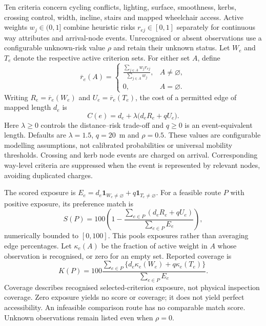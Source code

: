 \documentclass[preprint,12pt,a4paper]{elsarticle}
\begin{document}
Ten criteria concern cycling conflicts, lighting, surface, smoothness, kerbs,
crossing control, width, incline, stairs and mapped wheelchair access.
Active weights $w_j\in(0,1]$ combine heuristic risks $r_{ej}\in[0,1]$ separately
for continuous way attributes and arrival-node events. Unrecognised or absent
observations use a configurable unknown-risk value $\rho$ and retain their
unknown status. Let $W_e$ and $T_e$ denote the respective active criterion sets.
For either set $A$, define
\begin{equation}
\overline r_e(A)=
\begin{cases}
\displaystyle\frac{\sum_{j\in A}w_jr_{ej}}{\sum_{j\in A}w_j}, & A\ne\varnothing,\\
0, & A=\varnothing.
\end{cases}
\label{eq:risk}
\end{equation}
Writing $R_e=\overline r_e(W_e)$ and $U_e=\overline r_e(T_e)$, the cost of a
permitted edge of mapped length $d_e$ is
\begin{equation}
C(e)=d_e+\lambda\bigl(d_eR_e+qU_e\bigr).
\label{eq:cost}
\end{equation}
Here $\lambda\geq0$ controls the distance--risk trade-off and $q\geq0$ is an
event-equivalent length. Defaults are $\lambda=1.5$, $q=20$~m and $\rho=0.5$.
These values are configurable modelling assumptions, not calibrated
probabilities or universal mobility thresholds. Crossing and kerb node events
are charged on arrival. Corresponding way-level criteria are suppressed when
the event is represented by relevant nodes, avoiding duplicated charges.

The scored exposure is
$E_e=d_e\mathbf{1}_{W_e\ne\varnothing}+q\mathbf{1}_{T_e\ne\varnothing}$.
For a feasible route $P$ with positive exposure, its preference match is
\begin{equation}
S(P)=100\left(1-
\frac{\sum_{e\in P}(d_eR_e+qU_e)}{\sum_{e\in P}E_e}\right),
\label{eq:score}
\end{equation}
numerically bounded to $[0,100]$. This pools exposures rather than averaging
edge percentages. Let $\kappa_e(A)$ be the fraction of active weight in $A$
whose observation is recognised, or zero for an empty set. Reported coverage is
\begin{equation}
K(P)=100\frac{\sum_{e\in P}\{d_e\kappa_e(W_e)+q\kappa_e(T_e)\}}
{\sum_{e\in P}E_e}.
\label{eq:coverage}
\end{equation}
Coverage describes recognised selected-criterion exposure, not physical
inspection coverage. Zero exposure yields no score or coverage; it does not
yield perfect accessibility. An infeasible comparison route has no comparable
match score. Unknown observations remain listed even when $\rho=0$.
\end{document}
